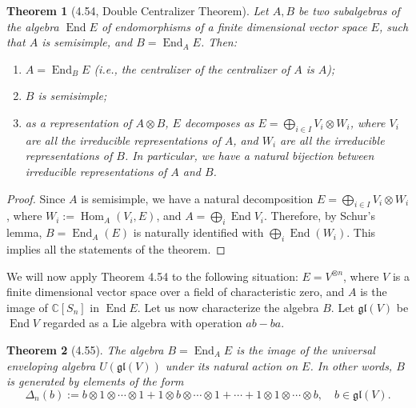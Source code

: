 \documentclass[UTF8,11pt]{ctexart}
\newtheorem*{theorem}{Theorem}
\theoremstyle{definition}
\DeclareMathOperator{\Hom}{Hom}
\newcommand{\C}{\mathbb C}
\begin{document}
\begin{theorem}[4.54, Double Centralizer Theorem]
Let $A,B$ be two subalgebras of the algebra $\operatorname{End}E$ of endomorphisms of a finite dimensional vector space $E$, such that $A$ is semisimple, and $B=\operatorname{End}_A E$. Then:
\begin{enumerate}[label=(\roman*)]
\item $A=\operatorname{End}_B E$ (i.e., the centralizer of the centralizer of $A$ is $A$);
\item $B$ is semisimple;
\item as a representation of $A\otimes B$, $E$ decomposes as $E=\bigoplus_{i\in I}V_i\otimes W_i$, where $V_i$ are all the irreducible representations of $A$, and $W_i$ are all the irreducible representations of $B$. In particular, we have a natural bijection between irreducible representations of $A$ and $B$.
\end{enumerate}
\end{theorem}
\begin{proof}
Since $A$ is semisimple, we have a natural decomposition $E=\bigoplus_{i\in I}V_i\otimes W_i$, where $W_i:=\Hom_A(V_i,E)$, and $A=\bigoplus_i\operatorname{End}V_i$. Therefore, by Schur's lemma, $B=\operatorname{End}_A(E)$ is naturally identified with $\bigoplus_i\operatorname{End}(W_i)$. This implies all the statements of the theorem.
\end{proof}
We will now apply Theorem 4.54 to the following situation: $E=V^{\otimes n}$, where $V$ is a finite dimensional vector space over a field of characteristic zero, and $A$ is the image of $\C[S_n]$ in $\operatorname{End}E$. Let us now characterize the algebra $B$. Let $\mathfrak{gl}(V)$ be $\operatorname{End}V$ regarded as a Lie algebra with operation $ab-ba$.
\begin{theorem}[4.55]
The algebra $B=\operatorname{End}_A E$ is the image of the universal enveloping algebra $U(\mathfrak{gl}(V))$ under its natural action on $E$. In other words, $B$ is generated by elements of the form
\[
\Delta_n(b):=b\otimes1\otimes\cdots\otimes1+1\otimes b\otimes\cdots\otimes1+\cdots+1\otimes1\otimes\cdots\otimes b,
\quad b\in\mathfrak{gl}(V).
\]
\end{theorem}
\end{document}
